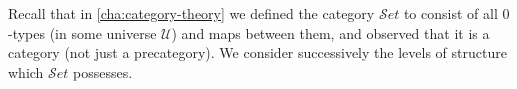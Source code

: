 \documentclass[12pt]{article}
\newcommand{\uset}{\ensuremath{\mathcal{S}et}\xspace}
\newcommand{\UU}{\ensuremath{\mathcal{U}}\xspace}
\let\autoref\cref
\begin{document}
Recall that in \autoref{cha:category-theory} we defined the category \uset to consist of all $0$-types (in some universe \UU) and maps between them, and observed that it is a category (not just a precategory).
We consider successively the levels of structure which \uset possesses.
\end{document}
